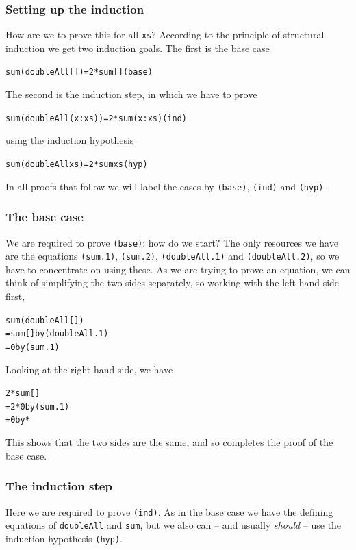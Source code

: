 \subsubsection*{Setting up the induction}

How are we to prove this for all \texttt{xs}? According to the principle of structural induction
we get two induction goals. The first is the base case
\begin{alltt}
sum (doubleAll []) = 2 * sum []\hfill(base)
\end{alltt}
The second is the induction step, in which we have to prove
\begin{alltt}
sum (doubleAll (x:xs)) = 2 * sum (x:xs)\hfill(ind)
\end{alltt}
using the induction hypothesis 
\begin{alltt}
sum (doubleAll xs) = 2 * sum xs\hfill(hyp)
\end{alltt}
In all proofs that follow we will label the cases by \texttt{(base)}, \texttt{(ind)}
and \texttt{(hyp)}.

\subsubsection*{The base case}

We are required to prove \texttt{(base)}: how do we start?
The only resources we have are the equations \texttt{(sum.1)}, \texttt{(sum.2)},
\texttt{(doubleAll.1)} and \texttt{(doubleAll.2)}, so we have to
concentrate on using these. As we are trying to prove an equation, we
can think of simplifying the two sides separately, so working with the
left-hand side first,
\begin{alltt}
sum (doubleAll [])
  = sum [] \hfill \textrm{by }(doubleAll.1)
  = 0 \hfill \textrm{by }(sum.1)
\end{alltt}
Looking at the right-hand side, we have
\begin{alltt}
2 * sum []
  = 2 * 0  \hfill \textrm{by }(sum.1)
  = 0 \hfill \textrm{by }*
\end{alltt}
This shows that the two sides are the same, and so completes the proof of the base
case.

\subsubsection*{The induction step}

Here we are required to prove \texttt{(ind)}. As in the base
case we have the defining equations of \texttt{doubleAll}
and \texttt{sum}, but we also can -- and usually {\em should\/} -- use
the induction hypothesis \texttt{(hyp)}.

